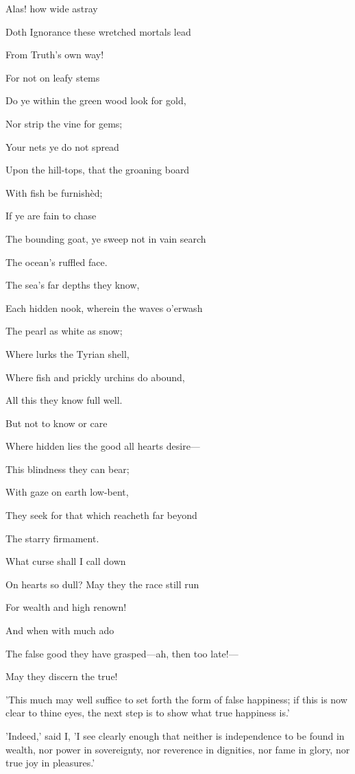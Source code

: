 
Alas! how wide astray

Doth Ignorance these wretched mortals lead

From Truth's own way!

For not on leafy stems

Do ye within the green wood look for gold,

Nor strip the vine for gems;

Your nets ye do not spread

Upon the hill-tops, that the groaning board

With fish be furnishèd;

If ye are fain to chase

The bounding goat, ye sweep not in vain search

The ocean's ruffled face.

The sea's far depths they know,

Each hidden nook, wherein the waves o'erwash

The pearl as white as snow;

Where lurks the Tyrian shell,

Where fish and prickly urchins do abound,

All this they know full well.

But not to know or care

Where hidden lies the good all hearts desire—

This blindness they can bear;

With gaze on earth low-bent,

They seek for that which reacheth far beyond

The starry firmament.

What curse shall I call down

On hearts so dull? May they the race still run

For wealth and high renown!

And when with much ado

The false good they have grasped—ah, then too late!—

May they discern the true!


'This much may well suffice to set forth the form of false happiness; if
this is now clear to thine eyes, the next step is to show what true
happiness is.'

'Indeed,' said I, 'I see clearly enough that neither is independence to
be found in wealth, nor power in sovereignty, nor reverence in
dignities, nor fame in glory, nor true joy in pleasures.'

